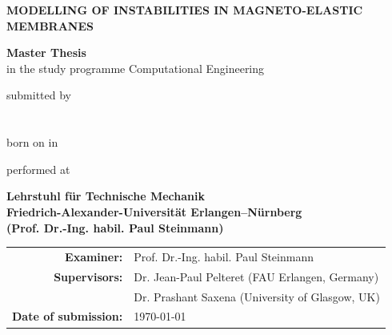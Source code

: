 \documentclass[a4paper,12pt,BCOR0mm,headsepline,final,oneside]{scrbook}
\newcommand{\thethesis}[0]{%
  Master Thesis
}
\newcommand{\field}[1]{%
  {\itshape \{#1\}}
}
\begin{document}
\frontmatter
\begin{titlepage}

  \begin{center}
    
    {\LARGE \bf
      \textbf{MODELLING OF INSTABILITIES IN MAGNETO-ELASTIC MEMBRANES}\\
    } 
    
    \vspace*{1.5cm}
    {\Large{\textbf{\thethesis} \\in the study programme Computational Engineering}}
    \vspace{1.5cm}
    
    {\large submitted by} \\
    \vspace*{0.5cm}
    {\Large \bf {}} \\
    \vspace*{0.2cm}
    {\large \bf {}} \\
    \vspace*{0.2cm}
    {\large born on  in } 
    
    \vspace{1.5cm}
    
    {\large performed at}

    \vspace{0.5cm}
    
    {\bf 
      Lehrstuhl f\"ur Technische Mechanik\\
      Friedrich-Alexander-Universit\"at Erlangen--N\"urnberg \\
      (Prof. Dr.-Ing. habil. Paul Steinmann)
      }
    
    \vspace{1cm}
    \begin{tabular}{rl}
    \textbf{Examiner:}& Prof. Dr.-Ing. habil. Paul Steinmann \vspace{0.5cm} \\    
    \textbf{Supervisors:}& Dr. Jean-Paul Pelteret (FAU Erlangen, Germany)\\
    		 & Dr. Prashant Saxena (University of Glasgow, UK) \vspace{0.5cm} \\    
    \textbf{Date of submission:}& \today
    \end{tabular}
    

\end{center}
\end{titlepage}
\end{document}

